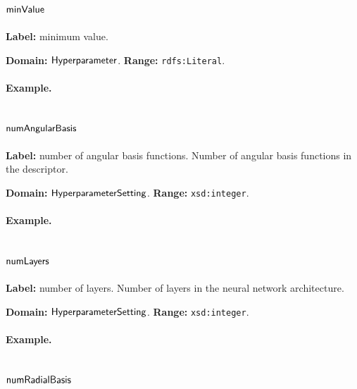 \subsection{$\mathsf{minValue}$}
\label{sec:term-minValue}

\textbf{Label:} minimum value.

\textbf{Domain:} $\mathsf{Hyperparameter}$.
\textbf{Range:} \texttt{rdfs:Literal}.

\paragraph{Example.}

\subsection{$\mathsf{numAngularBasis}$}
\label{sec:term-numAngularBasis}

\textbf{Label:} number of angular basis functions.
Number of angular basis functions in the descriptor.

\textbf{Domain:} $\mathsf{HyperparameterSetting}$.
\textbf{Range:} \texttt{xsd:integer}.

\paragraph{Example.}

\subsection{$\mathsf{numLayers}$}
\label{sec:term-numLayers}

\textbf{Label:} number of layers.
Number of layers in the neural network architecture.

\textbf{Domain:} $\mathsf{HyperparameterSetting}$.
\textbf{Range:} \texttt{xsd:integer}.

\paragraph{Example.}

\subsection{$\mathsf{numRadialBasis}$}
\label{sec:term-numRadialBasis}

